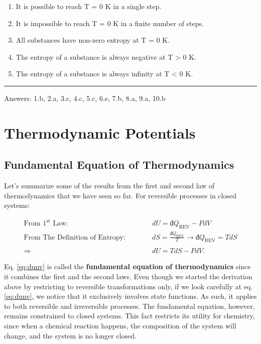 \documentclass[
  9pt,
]{extbook}
\providecommand{\tightlist}{%
  \setlength{\itemsep}{0pt}\setlength{\parskip}{0pt}}
\theoremstyle{definition}
\theoremstyle{definition}
\theoremstyle{definition}
\theoremstyle{definition}
\theoremstyle{remark}
\begin{document}
\begin{enumerate}
\def\labelenumi{\alph{enumi}.}
\tightlist
\item
  It is possible to reach T = 0 K in a single step.
\item
  It is impossible to reach T = 0 K in a finite number of steps.
\item
  All substances have non-zero entropy at T = 0 K.
\item
  The entropy of a substance is always negative at T \textgreater{} 0 K.
\item
  The entropy of a substance is always infinity at T \textless{} 0 K.
\end{enumerate}

\begin{center}\rule{0.5\linewidth}{0.5pt}\end{center}

Answers: 1.b, 2.a, 3.c, 4.c, 5.c, 6.e, 7.b, 8.a, 9.a, 10.b

\chapter{Thermodynamic Potentials}\label{Potentials}

\section{Fundamental Equation of Thermodynamics}\label{fundeq}

Let's summarize some of the results from the first and second law of thermodynamics that we have seen so far. For reversible processes in closed systems:

\begin{equation}
\begin{aligned}
\text{From 1}^{\text{st}} \text{ Law:} \qquad \quad & dU = đQ_{\mathrm{REV}}-PdV \\
\text{From The Definition of Entropy:} \qquad \quad & dS = \frac{đQ_{\mathrm{REV}}}{T} \rightarrow đQ_{\mathrm{REV}} = TdS \\
\\
\Rightarrow \quad & dU = TdS - PdV.
\end{aligned}
\label{eq:dunv}
\end{equation}

Eq. \eqref{eq:dunv} is called the \textbf{fundamental equation of thermodynamics} since it combines the first and the second laws. Even though we started the derivation above by restricting to reversible transformations only, if we look carefully at eq. \eqref{eq:dunv}, we notice that it exclusively involves state functions. As such, it applies to both reversible and irreversible processes. The fundamental equation, however, remains constrained to closed systems. This fact restricts its utility for chemistry, since when a chemical reaction happens, the composition of the system will change, and the system is no longer closed.
\end{document}
